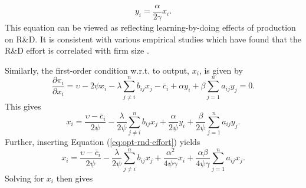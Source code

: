 \begin{equation}
y_i = \frac{\alpha}{2 \gamma} x_i.
\label{eq:opt-rnd-effort}
\end{equation}
This equation can be viewed as reflecting learning-by-doing effects of production on R\&D. It is consistent with various empirical studies which have found
that the R\&D effort is correlated with firm size \citep{cohen96:_firm_size_and_natur_of, cohen96:_repris_of_size_and_r_d}. 

Similarly, the first-order condition w.r.t. to output, $x_i$, is given by
\begin{equation*}
\frac{\partial \pi_i}{\partial x_i} = \upsilon - 2 \psi x_i - \lambda \sum_{j \ne i}^n b_{ij} x_j - \bar{c}_i  + \alpha y_i +
\beta \sum_{j=1}^n a_{ij} y_j = 0.
\end{equation*}
This gives
\begin{equation*}
x_i = \frac{\upsilon - \bar{c}_i}{2 \psi}  - \frac{\lambda}{2 \psi} \sum_{j \ne i}^n b_{ij} x_j +  \frac{\alpha}{2 \psi} y_i +
\frac{\beta}{2 \psi} \sum_{j=1}^n a_{ij} y_j.
\end{equation*}
Further, inserting Equation (\ref{eq:opt-rnd-effort}) yields
\begin{equation*}
x_i = \frac{\upsilon - \bar{c}_i}{2 \psi}  - \frac{\lambda}{2 \psi} \sum_{j \ne i}^n b_{ij} x_j +  \frac{\alpha^2}{4 \psi \gamma} x_i +
\frac{\alpha \beta}{4 \psi \gamma} \sum_{j=1}^n a_{ij} x_j .
\end{equation*}
Solving for $x_i$ then gives
